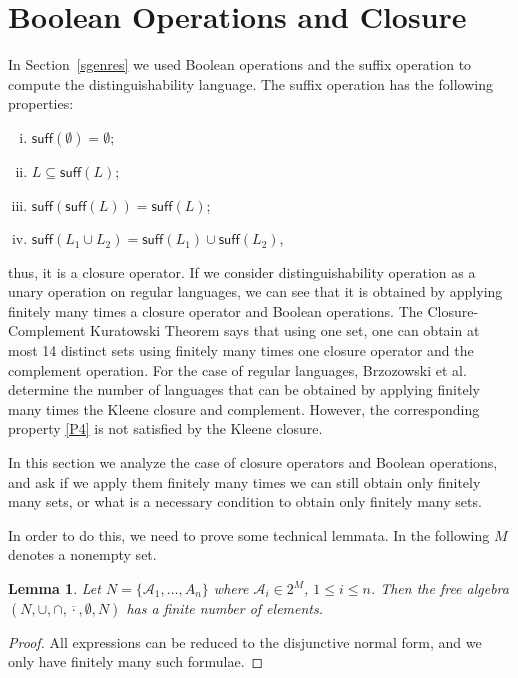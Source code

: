 \documentclass{article}
\newtheorem{lemma}{Lemma}
\newcommand{\comp}[1]{\overline{#1}}
\newcommand{\suff}[1]{\mathsf{suff}(#1)}
\begin{document}
\section{Boolean Operations and Closure}
\label{sec:sufclosuregeneral}

In Section~\ref{sgenres} we used Boolean operations and the suffix
operation to compute the distinguishability language. The suffix
operation has the following properties:
\begin{enumerate}[i)]
\item $\suff{\emptyset}=\emptyset$;
\item $L\subseteq \suff{L}$;
\item $\suff{\suff{L}}= \suff{L}$;
\item $\suff{L_1\cup L_2}=\suff{L_1}\cup \suff{L_2}$, 
\label{P4}
\end{enumerate}
thus, it is a closure operator.
If we consider distinguishability operation as a unary operation 
on regular languages, we can see that it is obtained by applying 
finitely many times a closure operator and Boolean operations.
 The Closure-Complement Kuratowski Theorem \cite{Kuratowski1922} 
 says that using one set, one can obtain at most 14
 distinct sets using finitely many times one closure operator 
 and the complement operation. 
For the case of regular languages,  
Brzozowski et al. \cite{brzozowski11:_closur_in_formal_languag_and_kurat_theor}
determine the number of languages that can be obtained 
by applying finitely many times the  Kleene closure and complement.
However, the corresponding property \ref{P4} is not satisfied by the Kleene closure.

In this section we analyze the case of closure operators 
and Boolean operations, and ask if we apply them finitely 
many times we can still obtain only finitely many sets, or 
what is a necessary condition to obtain only finitely many sets.

In order to do this, we need to prove some technical lemmata. In the following $M$ denotes a nonempty set.

\begin{lemma}
\label{lfiniteuint}
 Let $N=\{\mathcal{A}_1,\ldots,A_n\}$ where $\mathcal{A}_i\in 2^M$, $1\leq i\leq n$.
 Then the free algebra $(N,\cup,\cap,\comp{\cdot},\emptyset,N)$ 
has a finite number of elements.
 \end{lemma}
\begin{proof}
 All expressions can be reduced to the disjunctive normal form, 
 and we only have finitely many such formulae.
\end{proof}
\end{document}
